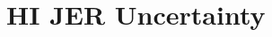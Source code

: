 \documentclass[fullpage]{uiucthesis2009}
\begin{document}
\chapter{HI JER Uncertainty}
\label{sec:appendix_hijerDerivation}

\clearpage
%
%
%
%
%
%
\end{document}
